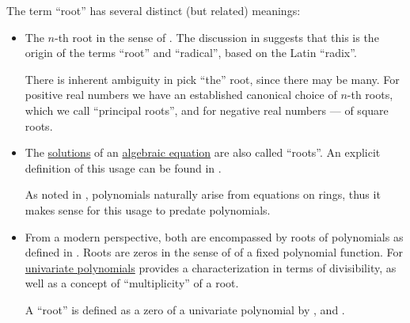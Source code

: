 \begin{remark}\label{rem:root_terminology}
  The term \enquote{root} has several distinct (but related) meanings:
  \begin{itemize}
    \item The \( n \)-th root in the sense of . The discussion in \cite{HSM:radical_symbol_history} suggests that this is the origin of the terms \enquote{root} and \enquote{radical}, based on the Latin \enquote{radix}.

    There is inherent ambiguity in pick \enquote{the} root, since there may be many. For positive real numbers we have an established canonical choice of \( n \)-th roots, which we call \enquote{principal roots}, and for negative real numbers --- of square roots.

    \item The \hyperref[def:first_order_equation]{solutions} of an \hyperref[def:algebraic_equation]{algebraic equation} are also called \enquote{roots}. An explicit definition of this usage can be found in .

    As noted in , polynomials naturally arise from equations on rings, thus it makes sense for this usage to predate polynomials.

    \item From a modern perspective, both are encompassed by roots of polynomials as defined in . Roots are zeros in the sense of  of a fixed polynomial function. For \hyperref[def:univariate_polynomial]{univariate polynomials}  provides a characterization in terms of divisibility, as well as a concept of \enquote{multiplicity} of a root.

    A \enquote{root} is defined as a zero of a univariate polynomial by
    ,
     and
    .
  \end{itemize}
\end{remark}

